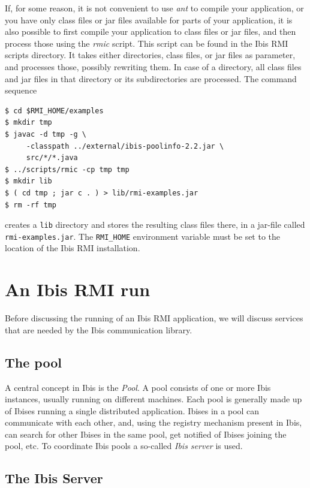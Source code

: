 \documentclass[a4paper,10pt]{article}
\begin{document}
If, for some reason, it is not convenient to use \emph{ant} to compile
your application, or you have only class files or jar files available
for parts of your application, it is also possible to first compile
your application to class files or jar files, and then process those
using the \emph{rmic} script. This script can be found in the Ibis RMI
scripts directory. It takes either directories, class files, or jar files
as parameter, and processes those, possibly rewriting them. In case
of a directory, all class files and jar files in that directory or
its subdirectories are processed.  The command sequence

\begin{verbatim}
$ cd $RMI_HOME/examples
$ mkdir tmp
$ javac -d tmp -g \
     -classpath ../external/ibis-poolinfo-2.2.jar \
     src/*/*.java
$ ../scripts/rmic -cp tmp tmp
$ mkdir lib
$ ( cd tmp ; jar c . ) > lib/rmi-examples.jar
$ rm -rf tmp
\end{verbatim}

creates a \texttt{lib} directory and stores the resulting class files there,
in a jar-file called \texttt{rmi-examples.jar}.
The \texttt{RMI\_HOME} environment variable must be set to the location of
the Ibis RMI installation.

\section{An Ibis RMI run}

Before discussing
the running of an Ibis RMI application, we will discuss services that are
needed by the Ibis communication library.

\subsection{The pool}

A central concept in Ibis is the \emph{Pool}. A pool consists of one or
more Ibis instances, usually running on different machines. Each pool is
generally made up of Ibises running a single distributed application.
Ibises in a pool can communicate with each other, and, using the
registry mechanism present in Ibis, can search for other Ibises in the
same pool, get notified of Ibises joining the pool, etc. To
coordinate Ibis pools a so-called \emph{Ibis server} is used.

\subsection{The Ibis Server}
\end{document}
